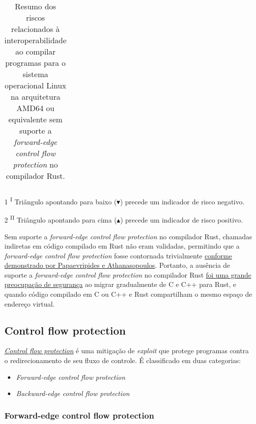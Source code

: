 \documentclass{article}
\begin{document}
\begin{table}[H]
\begin{tabular}{p{0.3\linewidth} | p{0.3\linewidth} | p{0.3\linewidth}}
\end{tabular}
\begin{tablenotes}
\item[1] \textsuperscript{I} Triângulo apontando para baixo ($\blacktriangledown$) precede um indicador de risco negativo.
\item[2] \textsuperscript{II} Triângulo apontando para cima ($\blacktriangleup$) precede um indicador de risco positivo.
\end{tablenotes}
\caption{\label{table1}Resumo dos riscos relacionados à interoperabilidade ao compilar programas para o sistema operacional Linux na arquitetura AMD64 ou equivalente sem suporte a \textit{forward-edge control flow protection} no compilador Rust.}
\end{table}

Sem suporte a \textit{forward-edge control flow protection} no compilador Rust, chamadas indiretas em código compilado em Rust não eram validadas, permitindo que a \textit{forward-edge control flow protection} fosse contornada trivialmente \href{https://dl.acm.org/doi/ pdf/10.1145/3418898}{conforme demonstrado por Papaevripides e Athanasopoulos}. Portanto, a ausência de suporte a \textit{forward-edge control flow protection} no compilador Rust \href{https://opensrcsec.com/open_source_security_announces_rust_gcc_funding}{foi uma grande preocupação de segurança} ao migrar gradualmente de C e C++ para Rust, e quando código compilado em C ou C++ e Rust compartilham o mesmo espaço de endereço virtual.


\subsection{Control flow protection}
\label{control-flow-protection}

\href{https://en.wikipedia.org/wiki/Control-flow_integrity}{\textit{Control flow protection}} é uma mitigação de \textit{exploit} que protege programas contra o redirecionamento de seu fluxo de controle. É classificado em duas categorias:

\begin{itemize}
\item \textit{Forward-edge control flow protection}
\item \textit{Backward-edge control flow protection}
\end{itemize}


\subsubsection{Forward-edge control flow protection}
\end{document}

